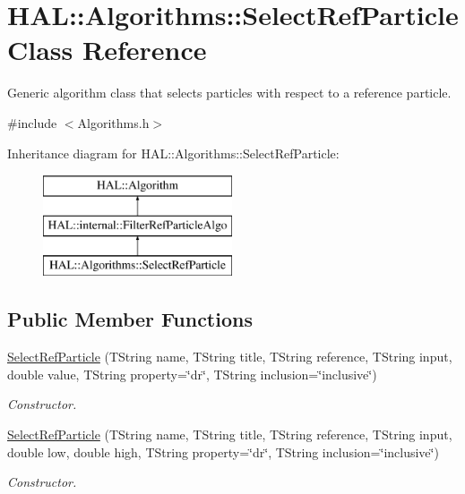 \hypertarget{class_h_a_l_1_1_algorithms_1_1_select_ref_particle}{\section{H\-A\-L\-:\-:Algorithms\-:\-:Select\-Ref\-Particle Class Reference}
\label{class_h_a_l_1_1_algorithms_1_1_select_ref_particle}
}


Generic algorithm class that selects particles with respect to a reference particle.  




{\ttfamily \#include $<$Algorithms.\-h$>$}

Inheritance diagram for H\-A\-L\-:\-:Algorithms\-:\-:Select\-Ref\-Particle\-:\begin{figure}[H]
\begin{center}
\leavevmode
\includegraphics[height=3.000000cm]{class_h_a_l_1_1_algorithms_1_1_select_ref_particle}
\end{center}
\end{figure}
\subsection*{Public Member Functions}
\begin{DoxyCompactItemize}
\item 
\hyperlink{class_h_a_l_1_1_algorithms_1_1_select_ref_particle_af0c5f5e66e54f7bc102e32148867892e}{Select\-Ref\-Particle} (T\-String name, T\-String title, T\-String reference, T\-String input, double value, T\-String property=\char`\"{}dr\char`\"{}, T\-String inclusion=\char`\"{}inclusive\char`\"{})
\begin{DoxyCompactList}\small\item\em Constructor. \end{DoxyCompactList}\item 
\hyperlink{class_h_a_l_1_1_algorithms_1_1_select_ref_particle_a68f9c3c857223c9a84b73e1569cdecaf}{Select\-Ref\-Particle} (T\-String name, T\-String title, T\-String reference, T\-String input, double low, double high, T\-String property=\char`\"{}dr\char`\"{}, T\-String inclusion=\char`\"{}inclusive\char`\"{})
\begin{DoxyCompactList}\small\item\em Constructor. \end{DoxyCompactList}\end{DoxyCompactItemize}

